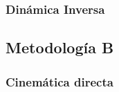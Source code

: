         \newpage
        \subsubsection{Dinámica Inversa}
        
        
        
        
        
        
        
        
        
        
        
        
        
        
        
        
        
        
        
        
        \newpage

        
    \subsection{Metodología B}
        \subsubsection{Cinemática directa}
        
